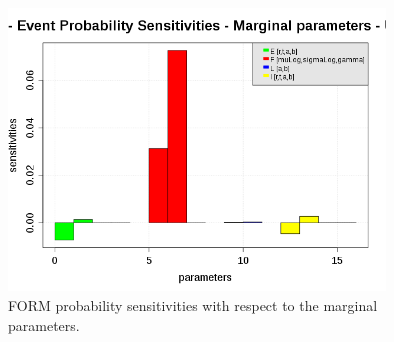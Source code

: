 \begin{figure}[H]
  \begin{center}
    \includegraphics[width=10cm]{EventProbabilityIndexMarginalSensitivityDrawing.png}
  \end{center}
  \caption{FORM probability sensitivities with respect to the marginal parameters.}
  \label{FORMProbaSensitivity}
\end{figure}
